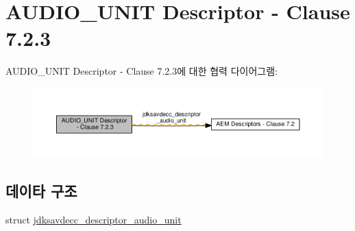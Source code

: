 \hypertarget{group__descriptor__audio}{}\section{A\+U\+D\+I\+O\+\_\+\+U\+N\+IT Descriptor -\/ Clause 7.2.3}
\label{group__descriptor__audio}
A\+U\+D\+I\+O\+\_\+\+U\+N\+IT Descriptor -\/ Clause 7.2.3에 대한 협력 다이어그램\+:
\nopagebreak
\begin{figure}[H]
\begin{center}
\leavevmode
\includegraphics[width=350pt]{group__descriptor__audio}
\end{center}
\end{figure}
\subsection*{데이타 구조}
\begin{DoxyCompactItemize}
\item 
struct \hyperlink{structjdksavdecc__descriptor__audio__unit}{jdksavdecc\+\_\+descriptor\+\_\+audio\+\_\+unit}
\end{DoxyCompactItemize}
